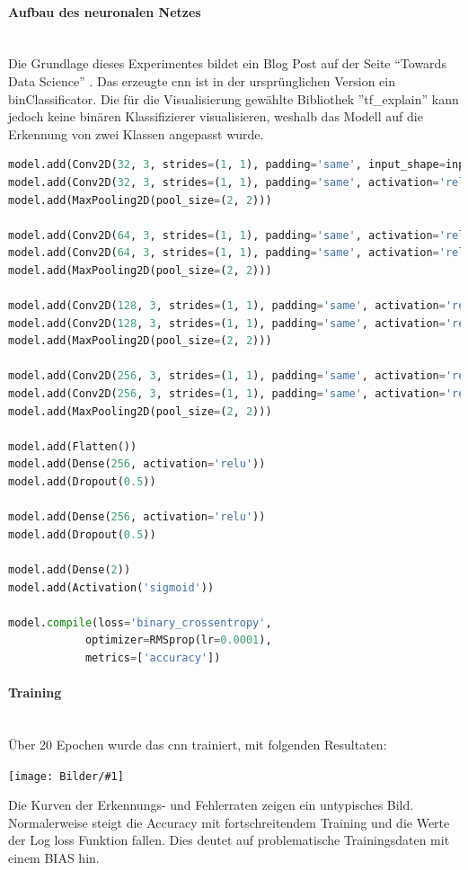 \documentclass[
  12pt, %
  a4paper, %
  oneside, %
  openany, 
  numbers=noenddot, %
  BCOR=5mm, %
  parskip=half*, %
  thesis, %
]{bfhbook}
\newcommand{\parag}[1]{\paragraph*{#1}\mbox{}\\}
\newcommand{\imgText}[3]{
\begin{center}
    \begin{minipage}[t]{0.6\textwidth}
    		\vspace{0pt}
		\texttt{[image: Bilder/\#1]}
		\captionof{figure}{#2}
	\end{minipage}\hfill
    \begin{minipage}[t]{0.4\textwidth}
    		\vspace{5pt}
  		#3
    \end{minipage}
\end{center}
}
\begin{document}
\parag{Aufbau des neuronalen Netzes}

Die Grundlage dieses Experimentes bildet ein Blog Post auf der Seite ``Towards Data Science''  \cite{dogVsCats}. Das erzeugte \acrshort{cnn} ist in der ursprünglichen Version ein \gls{binClassificator}. Die für die Visualisierung gewählte Bibliothek ''tf\_explain'' \cite{tfExplain} kann jedoch keine binären Klassifizierer visualisieren, weshalb das Modell auf die Erkennung von zwei Klassen angepasst wurde.

\begin{lstlisting}[language=Python, caption=CNN für Dog vs. Cats]
model.add(Conv2D(32, 3, strides=(1, 1), padding='same', input_shape=input_shape, activation='relu'))
model.add(Conv2D(32, 3, strides=(1, 1), padding='same', activation='relu'))
model.add(MaxPooling2D(pool_size=(2, 2)))

model.add(Conv2D(64, 3, strides=(1, 1), padding='same', activation='relu'))
model.add(Conv2D(64, 3, strides=(1, 1), padding='same', activation='relu'))
model.add(MaxPooling2D(pool_size=(2, 2)))

model.add(Conv2D(128, 3, strides=(1, 1), padding='same', activation='relu'))
model.add(Conv2D(128, 3, strides=(1, 1), padding='same', activation='relu'))
model.add(MaxPooling2D(pool_size=(2, 2)))

model.add(Conv2D(256, 3, strides=(1, 1), padding='same', activation='relu'))
model.add(Conv2D(256, 3, strides=(1, 1), padding='same', activation='relu'))
model.add(MaxPooling2D(pool_size=(2, 2)))

model.add(Flatten())
model.add(Dense(256, activation='relu'))
model.add(Dropout(0.5))

model.add(Dense(256, activation='relu'))
model.add(Dropout(0.5))

model.add(Dense(2))
model.add(Activation('sigmoid'))
    
model.compile(loss='binary_crossentropy',
            optimizer=RMSprop(lr=0.0001),
            metrics=['accuracy'])
\end{lstlisting}

\parag{Training}
Über 20 Epochen wurde das \acrshort{cnn} trainiert, mit folgenden Resultaten:
\imgText{Training-Manipulated-LogLoss.png}{Log-loss / Accuracy Dog vs. Cat}{
Die Kurven der Erkennungs- und Fehlerraten zeigen ein untypisches Bild. Normalerweise steigt die Accuracy mit fortschreitendem Training und die Werte der Log loss Funktion fallen. Dies deutet auf problematische Trainingsdaten mit einem \Gls{BIAS} hin.
}
\end{document}
